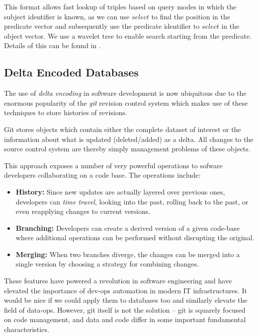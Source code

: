 \documentclass[10pt, a4paper, twocolumn]{article} %
\begin{document}
This format allows fast lookup of triples based on query modes in
which the subject identifier is known, as we can use \(select\) to
find the position in the predicate vector and subsequently use the
predicate identifier to \(select\) in the object vector. We use a
wavelet tree to enable search starting from the predicate. Details of
this can be found in \cite{10.1007/978-3-642-30284-8_36}.

\subsection{Delta Encoded Databases}

The use of {\em delta encoding} in software development is now
ubiquitous due to the enormous popularity of the {\em git} revision
control system which makes use of these techniques to store histories
of revisions.

Git stores objects which contain either the complete dataset of
interest or the information about what is updated (deleted/added) as
a delta. All changes to the source control system are thereby simply
management problems of these objects.

This approach exposes a number of very powerful operations to sofware
developers collaborating on a code base. The operations include:

\begin{itemize}
\item {\bf History:} Since new updates are actually layered over previous
  ones, developers can {\em time travel}, looking into the past,
  rolling back to the past, or even reapplying changes to current
  versions.
\item {\bf Branching:} Developers can create a derived version of a given
  code-base where additional operations can be performed without
  disrupting the original.
\item {\bf Merging:} When two branches diverge, the changes can be merged
  into a single version by choosing a strategy for combining changes.
\end{itemize}

These features have powered a revolution in software engineering and
have elevated the importance of dev-ops automation in modern IT
infrastructures. It would be nice if we could apply them to databases
too and similarly elevate the field of data-ops. However, git itself
is not the solution – git is squarely focused on code management, and
data and code differ in some important fundamental characteristics.
\end{document}
